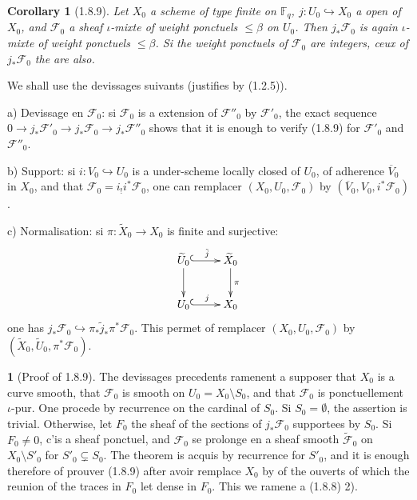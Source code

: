 \documentclass[12pt,a4paper]{article}
\theoremstyle{plain}
\newtheorem{corollary}[theorem]{Corollary}
\theoremstyle{definition}
\theoremstyle{definition}
\newtheorem{para}{}[section]
\theoremstyle{remark}
\begin{document}
\begin{corollary}[1.8.9]
Let $X_0$ a scheme of type finite on $\mathbb{F}_q$, $j: U_0 \hookrightarrow X_0$ a open of $X_0$, and $\mathscr{F}_0$ a sheaf $\iota$-mixte of weight ponctuels $\leq \beta$ on $U_0$. Then $j_* \mathscr{F}_0$ is again $\iota$-mixte of weight ponctuels $\leq \beta$. Si the weight ponctuels of $\mathscr{F}_0$ are integers, ceux of $j_* \mathscr{F}_0$ the are also.
\end{corollary}

We shall use the devissages suivants (justifies by (1.2.5)).

a) Devissage en $\mathscr{F}_0$: si $\mathscr{F}_0$ is a extension of $\mathscr{F}''_0$ by $\mathscr{F}'_0$, the exact sequence $0 \to j_* \mathscr{F}'_0 \to j_* \mathscr{F}_0 \to j_* \mathscr{F}''_0$ shows that it is enough to verify (1.8.9) for $\mathscr{F}'_0$ and $\mathscr{F}''_0$.

b) Support: si $i: V_0 \hookrightarrow U_0$ is a under-scheme locally closed of $U_0$, of adherence $\overline{V}_0$ in $X_0$, and that $\mathscr{F}_0 = i_! i^* \mathscr{F}_0$, one can remplacer $(X_0, U_0, \mathscr{F}_0)$ by $(\overline{V}_0, V_0, i^* \mathscr{F}_0)$.

c) Normalisation: si $\pi: \widetilde{X}_0 \to X_0$ is finite and surjective:
\[\xymatrix{
\widetilde{U}_0 \ar@{^{(}->}[r]^{\tilde{j}} \ar[d] & \widetilde{X}_0 \ar[d]^{\pi} \\
U_0 \ar@{^{(}->}[r]^j & X_0
}\]
one has $j_* \mathscr{F}_0 \hookrightarrow \pi_* \tilde{j}_* \pi^* \mathscr{F}_0$. This permet of remplacer $(X_0, U_0, \mathscr{F}_0)$ by $(\widetilde{X}_0, \widetilde{U}_0, \pi^* \mathscr{F}_0)$.

\begin{para}[Proof of 1.8.9]
The devissages precedents ramenent a supposer that $X_0$ is a curve smooth, that $\mathscr{F}_0$ is smooth on $U_0 = X_0 \setminus S_0$, and that $\mathscr{F}_0$ is ponctuellement $\iota$-pur. One procede by recurrence on the cardinal of $S_0$. Si $S_0 = \emptyset$, the assertion is trivial. Otherwise, let $F_0$ the sheaf of the sections of $j_* \mathscr{F}_0$ supportees by $S_0$. Si $F_0 \neq 0$, c'is a sheaf ponctuel, and $\mathscr{F}_0$ se prolonge en a sheaf smooth $\widetilde{\mathscr{F}}_0$ on $X_0 \setminus S'_0$ for $S'_0 \subsetneq S_0$. The theorem is acquis by recurrence for $S'_0$, and it is enough therefore of prouver (1.8.9) after avoir remplace $X_0$ by of the ouverts of which the reunion of the traces in $F_0$ let dense in $F_0$. This we ramene a (1.8.8) 2).
\end{para}
\end{document}
